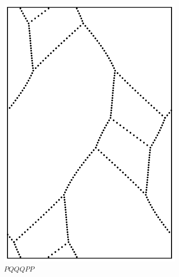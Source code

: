 \documentclass[12pt,twoside]{reedthesis}
\theoremstyle{definition}
\begin{document}
\begin{figure}[h]
\begin{subfigure}[t]{0.24\textwidth}
    \includegraphics[width=\textwidth]{figures/string_cheese_appendix/pqqqpp.pdf}
    \caption*{$PQQQPP$}
    \vspace{5mm}
  \end{subfigure}
  \begin{subfigure}[t]{0.24\textwidth}

\end{subfigure}
\end{figure}
\end{document}

